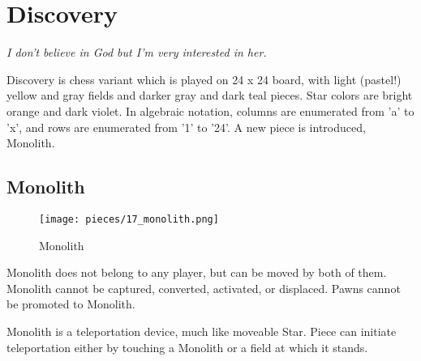 

\chapter*{Discovery}
\label{ch:Discovery}

\begin{flushright}
\parbox{0.8\textwidth}{
\emph{I don't believe in God but I'm very interested in her. \\
 } }
\end{flushright}

\noindent
Discovery is chess variant which is played on 24 x 24 board, with
light (pastel!) yellow and gray fields and darker gray and dark teal
pieces. Star colors are bright orange and dark violet. In algebraic
notation, columns are enumerated from 'a' to 'x', and rows are
enumerated from '1' to '24'. A new piece is introduced, Monolith.

\clearpage %

\section*{Monolith}
\label{sec:Discovery/Monolith}

\vspace*{-1.1\baselineskip}
\noindent
\begin{wrapfigure}[11]{l}{0.4\textwidth}
\centering
\texttt{[image: pieces/17\_monolith.png]}
\caption{Monolith}
\label{fig:17_monolith}
\end{wrapfigure}
Monolith does not belong to any player, but can be moved by both of them.
Monolith cannot be captured, converted, activated, or displaced.
Pawns cannot be promoted to Monolith.

Monolith is a teleportation device, much like moveable Star. Piece can
initiate teleportation either by touching a Monolith or a field at which
it stands.

